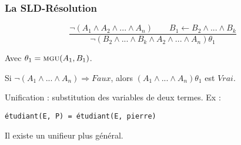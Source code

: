 \documentclass[aspectratio=43]{beamer}
\begin{document}
\begin{frame}[fragile]
  \frametitle{La SLD-Résolution}
  $$\frac{\neg(A_{1} \wedge A_{2} \wedge ... \wedge A_{n}) \qquad B_{1} \leftarrow B_{2} \wedge ... \wedge B_{k}}{\neg( B_{2} \wedge ... \wedge B_{k} \wedge A_{2} \wedge ... \wedge A_{n})\theta_{1}}$$
  
  \vspace{1em}
  Avec $\theta_{1} = \textsc{mgu}(A_{1}, B_{1})$.

  \vspace{1em}

  Si $\neg(A_{1} \wedge ... \wedge A_{n}) \Rightarrow Faux$, alors $(A_{1} \wedge ... \wedge A_{n})\theta_{1}$ est $Vrai$.
  
  \vspace{1em}

  Unification : substitution des variables de deux termes. Ex : \\
  \begin{verbatim}
étudiant(E, P) = étudiant(E, pierre)
  \end{verbatim}

  \vspace{1em}
  Il existe un unifieur plus général.
\end{frame}
\end{document}
